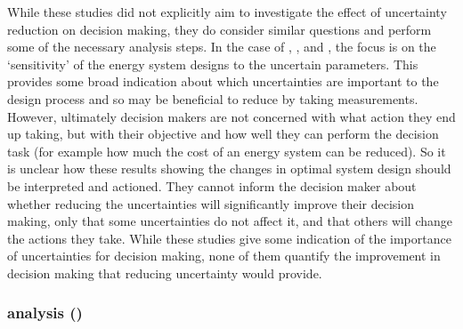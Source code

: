 While these studies did not explicitly aim to investigate the effect of uncertainty reduction on decision making, they do consider similar questions and perform some of the necessary analysis steps. In the case of , , and , the focus is on the `sensitivity' of the energy system designs to the uncertain parameters. This provides some broad indication about which uncertainties are important to the design process and so may be beneficial to reduce by taking measurements. However, ultimately decision makers are not concerned with what action they end up taking, but with their objective and how well they can perform the decision task (for example how much the cost of an energy system can be reduced). So it is unclear how these results showing the changes in optimal system design should be interpreted and actioned. They cannot inform the decision maker about whether reducing the uncertainties will significantly improve their decision making, only that some uncertainties do not affect it, and that others will change the actions they take. While these studies give some indication of the importance of uncertainties for decision making, none of them quantify the improvement in decision making that reducing uncertainty would provide.


\subsubsection{ analysis ()} \label{sec:voi-lit}


